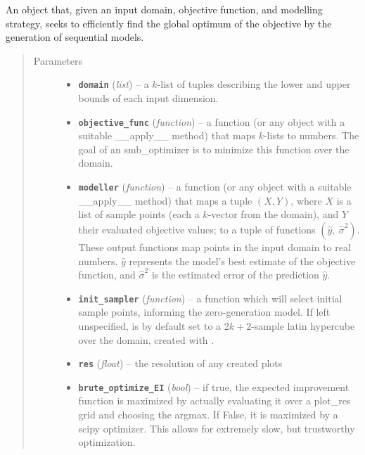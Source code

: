 \documentclass[letterpaper,10pt,english]{sphinxmanual}
\begin{document}
\begin{fulllineitems}
\label{index:smbo.smb_optimizer.smb_optimizer}
An object that, given an input domain, objective function, and modelling strategy, seeks to efficiently find
the global optimum of the objective by the generation of sequential models.
\begin{quote}\begin{description}
\item[{Parameters}] \leavevmode\begin{itemize}
\item {} 
\textbf{\texttt{domain}} (\emph{list}) -- a \(k\)-list of tuples describing the lower and upper bounds of each input dimension.

\item {} 
\textbf{\texttt{objective\_func}} (\emph{function}) -- a function (or any object with a suitable \_\_apply\_\_ method)
that maps \(k\)-lists to numbers. The goal of an smb\_optimizer is to minimize this
function over the domain.

\item {} 
\textbf{\texttt{modeller}} (\emph{function}) -- a function (or any object with a suitable \_\_apply\_\_ method) that maps a
tuple \((X,Y)\), where \(X\) is a list of sample points (each a \(k\)-vector from the domain),
and \(Y\) their evaluated objective values; to a tuple of functions
\((\hat{y},\ \hat{\sigma}^2)\). These output functions map points in the input domain to real numbers.
\(\hat{y}\) represents the model's best estimate of the objective function, and \(\hat{\sigma}^2\)
is the estimated error of the prediction \(\hat{y}\).

\item {} 
\textbf{\texttt{init\_sampler}} (\emph{function}) -- a function which will select initial sample points, informing the zero-generation model.
If left unspecified, is by default set to a \(2k+2\)-sample latin hypercube over the domain,
created with .

\item {} 
\textbf{\texttt{res}} (\emph{float}) -- the resolution of any created plots

\item {} 
\textbf{\texttt{brute\_optimize\_EI}} (\emph{bool}) -- if true, the expected improvement function is maximized by actually evaluating it over a plot\_res grid and choosing the argmax. If False, it is maximized by a scipy optimizer. This allows for extremely slow, but trustworthy optimization.


\end{itemize}
\end{description}
\end{quote}
\end{fulllineitems}
\end{document}
